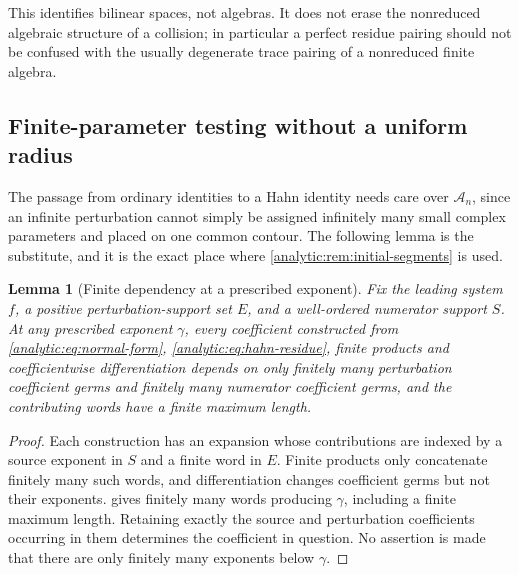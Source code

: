 \documentclass[11pt,letterpaper]{article}
\newtheorem{lemma}[theorem]{Lemma}
\theoremstyle{definition}
\theoremstyle{remark}
\newcommand{\A}{\mathscr A}
\numberwithin{equation}{section}
\begin{document}
This identifies bilinear spaces, not algebras. It does not erase the
nonreduced algebraic structure of a collision; in particular a perfect
residue pairing should not be confused with the usually degenerate trace
pairing of a nonreduced finite algebra.

\subsection{Finite-parameter testing without a uniform radius}
\label{analytic:subsec:finite-dependency}
The passage from ordinary identities to a Hahn identity needs care over
$\A_n$, since an infinite perturbation cannot simply be assigned infinitely
many small complex parameters and placed on one common contour. The
following lemma is the substitute, and it is the exact place where
\cref{analytic:rem:initial-segments} is used.

\begin{lemma}[Finite dependency at a prescribed exponent]
\label{analytic:lem:finite-dependency}
Fix the leading system $f$, a positive perturbation-support set $E$, and a
well-ordered numerator support $S$. At any prescribed exponent $\gamma$,
every coefficient constructed from \eqref{analytic:eq:normal-form},
\eqref{analytic:eq:hahn-residue}, finite products and coefficientwise
differentiation depends on only finitely many perturbation coefficient
germs and finitely many numerator coefficient germs, and the contributing
words have a finite maximum length.
\end{lemma}
\begin{proof}
Each construction has an expansion whose contributions are indexed by a
source exponent in $S$ and a finite word in $E$. Finite products only
concatenate finitely many such words, and differentiation changes
coefficient germs but not their exponents. 
gives finitely many words producing $\gamma$, including a finite maximum
length. Retaining exactly the source and perturbation coefficients occurring
in them determines the coefficient in question. No assertion is made that
there are only finitely many exponents below $\gamma$.
\end{proof}
\end{document}
